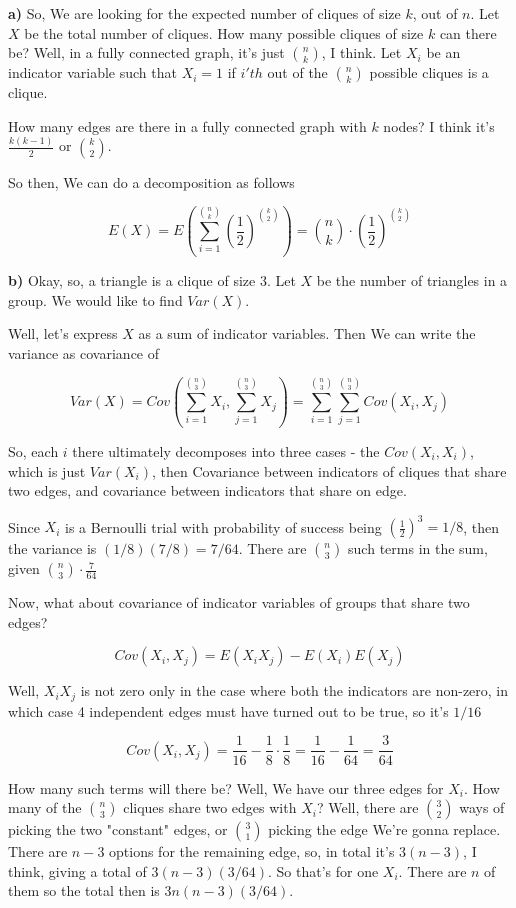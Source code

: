 \documentclass{article}
\begin{document}
			\textbf{a)} So, We are looking for the expected number of cliques of size $k$, out of $n$. Let $X$ be the total number of cliques. How many possible cliques of size $k$ can there be? Well, in a fully connected graph, it's just ${n\choose k}$, I think. Let $X_i$ be an indicator variable such that $X_i=1$ if $i'th$ out of the ${n\choose k}$ possible cliques is a clique.
			
			How many edges are there in a fully connected graph with $k$ nodes? I think it's $\frac{k(k-1)}{2}$ or ${k\choose 2}$.
			
			So then, We can do a decomposition as follows
			
			\[ E(X) = E\left(\sum^{{n\choose k}}_{i=1} \left(\frac{1}{2}\right)^{{k\choose 2}}\right) = {n\choose k}\cdot \left(\frac{1}{2}\right)^{{k\choose 2}} \]
			
			\textbf{b)} Okay, so, a triangle is a clique of size 3. Let $X$ be the number of triangles in a group. We would like to find $Var(X)$.
			
			Well, let's express $X$ as a sum of indicator variables. Then We can write the variance as covariance of
			
			\[ Var(X) = Cov\left(\sum^{{n\choose 3}}_{i=1} X_i, \sum^{{n\choose 3}}_{j=1} X_j \right) = \sum^{{n\choose 3}}_{i=1} \sum^{{n\choose 3}}_{j=1} Cov(X_i, X_j) \] 
			
			So, each $i$ there ultimately decomposes into three cases - the $Cov(X_i, X_i)$, which is just $Var(X_i)$, then Covariance between indicators of cliques that share two edges, and covariance between indicators that share on edge.
			
			Since $X_i$ is a Bernoulli trial with probability of success being $\left(\frac{1}{2} \right)^3 = 1/8$, then the variance is $(1/8)(7/8)=7/64$. There are ${n\choose 3}$ such terms in the sum, given ${n\choose 3}\cdot \frac{7}{64}$ 
			
			Now, what about covariance of indicator variables of groups that share two edges? 
			
			\[ Cov(X_i, X_j) = E(X_iX_j) - E(X_i)E(X_j) \]
			
			Well, $X_iX_j$ is not zero only in the case where both the indicators are non-zero, in which case 4 independent edges must have turned out to be true, so it's $1/16$
			
			\[ Cov(X_i, X_j) = \frac{1}{16} - \frac{1}{8}\cdot\frac{1}{8} = \frac{1}{16} - \frac{1}{64} = \frac{3}{64} \]
			
			How many such terms will there be? Well, We have our three edges for $X_i$. How many of the ${n\choose 3}$ cliques share two edges with $X_i$? Well, there are ${3\choose 2}$ ways of picking the two "constant" edges, or ${3\choose 1}$ picking the edge We're gonna replace. There are $n-3$ options for the remaining edge, so, in total it's $3(n-3)$, I think, giving a total of $3(n-3)(3/64)$. So that's for one $X_i$. There are $n$ of them so the total then is $3n(n-3)(3/64)$.
			
\end{document}
